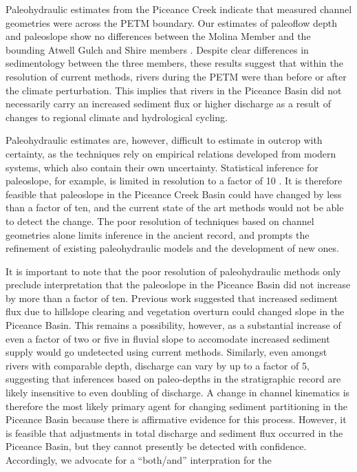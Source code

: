 \documentclass[draft]{compact_proposal}
\begin{document}

Paleohydraulic estimates from the Piceance Creek indicate that measured channel geometries were  across the PETM boundary.
Our estimates of paleoflow depth and paleoslope show no differences between the Molina Member and the bounding Atwell Gulch and Shire members .
Despite clear differences in sedimentology between the three members, these results suggest that within the resolution of current methods, rivers during the PETM were  than before or after the climate perturbation.
This implies that rivers in the Piceance Basin did not necessarily carry an increased sediment flux or higher discharge as a result of changes to regional climate and hydrological cycling.

Paleohydraulic estimates are, however, difficult to estimate in outcrop with certainty, as the techniques rely on empirical relations developed from modern systems, which also contain their own uncertainty.
Statistical inference for paleoslope, for example, is limited in resolution to a factor of 10 \cnote.
It is therefore feasible that paleoslope in the Piceance Creek Basin could have changed by less than a factor of ten, and the current state of the art methods would not be able to detect the change.
The poor resolution of techniques based on channel geometries alone limits inference in the ancient record, and prompts the refinement of existing paleohydraulic models and the development of new ones.

It is important to note that the poor resolution of paleohydraulic methods only preclude interpretation that the paleoslope in the Piceance Basin did not increase by more than a factor of ten.
Previous work suggested that increased sediment flux due to hillslope clearing and vegetation overturn could changed slope in the Piceance Basin.
This remains a possibility, however, as a substantial increase of even a factor of two or five in fluvial slope to accomodate increased sediment supply would go undetected using current methods.
Similarly, even amongst rivers with comparable depth,  discharge can vary by up to a factor of 5, suggesting that inferences based on paleo-depths in the stratigraphic record are likely insensitive to even doubling of discharge.
A change in channel kinematics is therefore the most likely primary agent for changing sediment partitioning in the Piceance Basin because there is affirmative evidence for this process.
However, it is feasible that adjustments in total discharge and sediment flux occurred in the Piceance Basin, but they cannot presently be detected with confidence.
Accordingly, we advocate for a ``both/and'' interpration for the 
\end{document}

